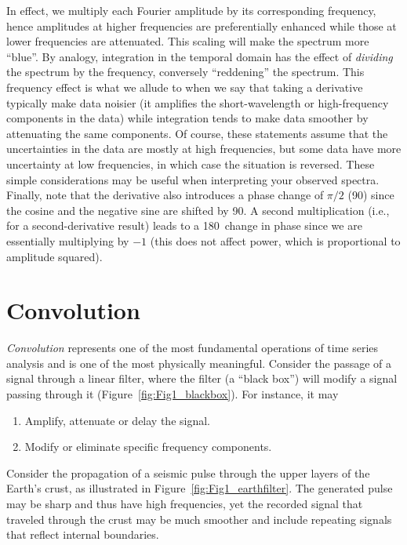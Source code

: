 In effect, we multiply each Fourier amplitude by its corresponding frequency, hence amplitudes at higher frequencies are preferentially enhanced while those at lower frequencies are attenuated.  This scaling
will make the spectrum more ``blue''.  By analogy, integration in the temporal domain has the effect of \emph{dividing} the spectrum by the frequency, conversely
``reddening'' the spectrum.  This frequency effect is what we allude to when we say that taking a derivative typically make data noisier (it amplifies
the short-wavelength or high-frequency components in the data) while integration tends to make data smoother by attenuating the same
components.  Of course, these statements assume that the uncertainties in the data are mostly at high frequencies, but some data have more
uncertainty at low frequencies, in which case the situation is reversed.
These simple considerations may be useful when interpreting your observed spectra.  Finally, note that the derivative
also introduces a phase change of $\pi/2$ (90\DS) since the cosine and the negative sine are shifted by 90\DS.  A second multiplication (i.e., for a second-derivative result)
leads to a 180\DS\ change in phase since we are essentially multiplying by $-1$ (this does not affect power, which is proportional to amplitude squared).


\section{Convolution}

	\emph{Convolution} represents one of the most fundamental operations of time series analysis and 
is one of the most physically meaningful.  Consider the passage of a signal through a linear filter, 
where the filter (a ``black box'') will modify a signal passing through it
(Figure~\ref{fig:Fig1_blackbox}).  For instance, it may
\begin{enumerate}
\item Amplify, attenuate or delay the signal.
\item Modify or eliminate specific frequency components.
\end{enumerate}
 

Consider the propagation of a seismic pulse through the upper layers of the Earth's crust, as illustrated
in Figure~\ref{fig:Fig1_earthfilter}.  The generated pulse may be sharp and thus have high
frequencies, yet the recorded signal that traveled through the crust may be much smoother and
include repeating signals that reflect internal boundaries.
 
